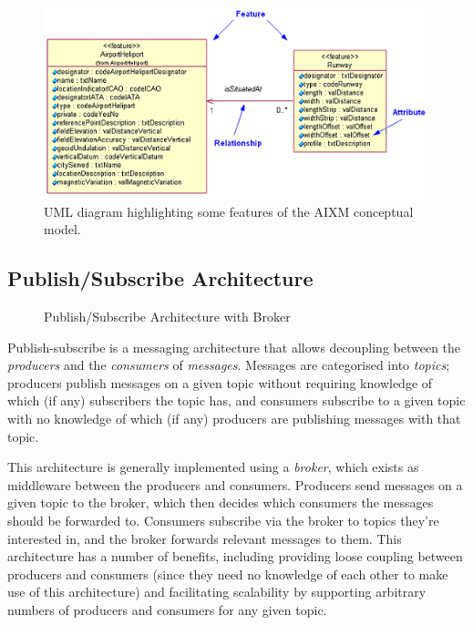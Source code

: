 \documentclass[a4paper, 12pt, twoside]{article}
\begin{document}
\begin{figure}
\begin{center}
\def\svgwidth{\columnwidth}
\includegraphics[scale=0.5]{aixmUML.png}
\end{center}
\caption{UML diagram highlighting some features of the AIXM conceptual model.\cite{aixm}}
\label{fig:aixm}
\end{figure}

\newpage

\subsection{Publish/Subscribe Architecture}
\label{sec:bg_pubsub}

\begin{figure}
\begin{center}
\def\svgwidth{\columnwidth}

\end{center}
\caption{Publish/Subscribe Architecture with Broker}
\label{fig:pubsub}
\end{figure}

Publish-subscribe is a messaging architecture that allows decoupling between the \emph{producers} and the \emph{consumers} of \emph{messages}. Messages are categorised into \emph{topics}; producers publish messages on a given topic without requiring knowledge of which (if any) subscribers the topic has, and consumers subscribe to a given topic with no knowledge of which (if any) producers are publishing messages with that topic.

This architecture is generally implemented using a \emph{broker}, which exists as middleware between the producers and consumers. Producers send messages on a given topic to the broker, which then decides which consumers the messages should be forwarded to. Consumers subscribe via the broker to topics they’re interested in, and the broker forwards relevant messages to them. This architecture has a number of benefits, including providing loose coupling between producers and consumers (since they need no knowledge of each other to make use of this architecture) and facilitating scalability by supporting arbitrary numbers of producers and consumers for any given topic.
\end{document}
